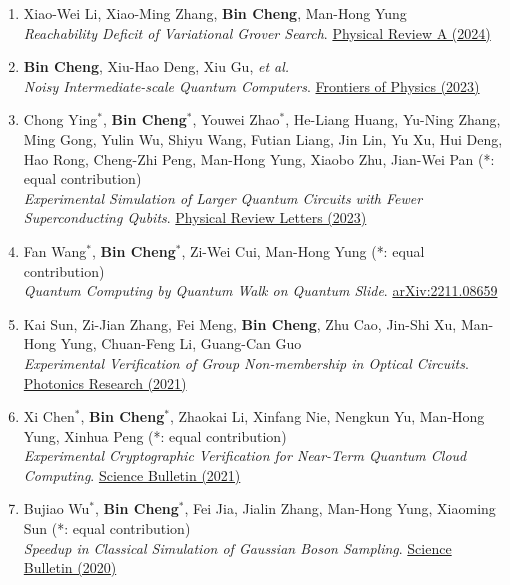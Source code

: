 \documentclass[margin,line,a4paper]{resume}
\newcommand{\lightblue}[1]{\textcolor{blue!60!cyan}{#1}}
\begin{document}
\begin{resume}
\begin{enumerate}
    \item Xiao-Wei Li, Xiao-Ming Zhang, \textbf{Bin Cheng}, Man-Hong Yung \\
    \emph{Reachability Deficit of Variational Grover Search}. \href{https://journals.aps.org/pra/abstract/10.1103/PhysRevA.109.012414}{Physical Review A (2024)}

    \item \textbf{Bin Cheng}, Xiu-Hao Deng, Xiu Gu, \emph{et al.} \\
    \emph{Noisy Intermediate-scale Quantum Computers}. \href{https://doi.org/10.1007/s11467-022-1249-z}{Frontiers of Physics (2023)}

    \item Chong Ying$^*$, \textbf{Bin Cheng}$^*$, Youwei Zhao$^*$, He-Liang Huang, Yu-Ning Zhang, Ming Gong, Yulin Wu, Shiyu Wang, Futian Liang, Jin Lin, Yu Xu, Hui Deng, Hao Rong, Cheng-Zhi Peng, Man-Hong Yung, Xiaobo Zhu, Jian-Wei Pan (\lightblue{*: equal contribution}) \\
    \emph{Experimental Simulation of Larger Quantum Circuits with Fewer Superconducting Qubits}. \href{https://journals.aps.org/prl/abstract/10.1103/PhysRevLett.130.110601}{Physical Review Letters (2023)}
    
    \item Fan Wang$^*$, \textbf{Bin Cheng}$^*$, Zi-Wei Cui, Man-Hong Yung (\lightblue{*: equal contribution}) \\
    \emph{Quantum Computing by Quantum Walk on Quantum Slide}. \href{https://arxiv.org/abs/2211.08659}{arXiv:2211.08659}
	
	\item Kai Sun, Zi-Jian Zhang, Fei Meng, \textbf{Bin Cheng}, Zhu Cao, Jin-Shi Xu, Man-Hong Yung, Chuan-Feng Li, Guang-Can Guo \\
    \emph{Experimental Verification of Group Non-membership in Optical Circuits}. \href{https://opg.optica.org/prj/fulltext.cfm?uri=prj-9-9-1745&id=457378}{Photonics Research (2021)}
	
	\item Xi Chen$^*$, \textbf{Bin Cheng}$^*$, Zhaokai Li, Xinfang Nie, Nengkun Yu, Man-Hong Yung, Xinhua Peng (\lightblue{*: equal contribution}) \\
    \emph{Experimental Cryptographic Verification for Near-Term Quantum Cloud Computing}. \href{https://doi.org/10.1016/j.scib.2020.08.013}{Science Bulletin (2021)}  

	\item Bujiao Wu$^*$, \textbf{Bin Cheng}$^*$, Fei Jia, Jialin Zhang, Man-Hong Yung, Xiaoming Sun (\lightblue{*: equal contribution}) \\
    \emph{Speedup in Classical Simulation of Gaussian Boson Sampling}. \href{https://doi.org/10.1016/j.scib.2020.02.012}{Science Bulletin (2020)}


\end{enumerate}
\end{resume}
\end{document}
